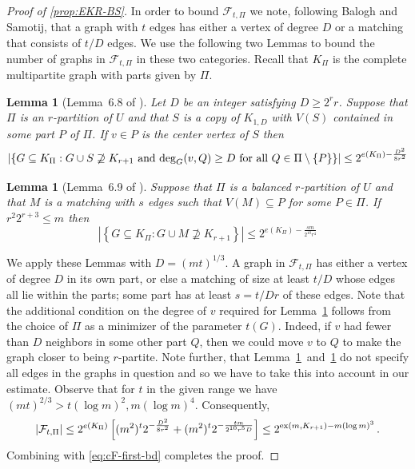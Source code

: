\documentclass[11pt]{article}
\newtheorem{lemma}[theorem]{Lemma}
\theoremstyle{definition}
\theoremstyle{remark}
\newcommand{\cF}{\mathcal{F}}
\begin{document}
\begin{proof}[Proof of \cref{prop:EKR-BS}]
    In order to bound $ \cF_{t, \Pi}$ we note, following Balogh and Samotij, 
    that  a graph with $t$ edges has
    either a vertex of degree $D$ or a matching that consists of $t/D$ edges.  
    We use the following two Lemmas
    to bound the number of graphs in $ \cF_{t, \Pi}$ in these two categories. Recall that $ K_\Pi$ is the complete multipartite graph with parts given by $\Pi$.
    \begin{lemma}[Lemma~6.8 of \cite{balogh2019efficient}] \label{lem:star}
    Let $ D$ be an integer satisfying $D \ge 2^rr$. Suppose that $ \Pi$ is an $r$-partition of $ U$ and that $S$ is a copy of $ K_{1,D}$ with $ V(S)$ contained in some part $P$ of $ \Pi$. If $v \in P$ is the center  vertex of $S$ then
    \[ \left| \left\{ G \subseteq K_\Pi: G \cup S \not\supseteq K_{r+1} \text{ and }
    {\rm deg}_G(v,Q) \ge D \text{ for all } Q \in \Pi \setminus \{P\}
    \right\} \right| \le 2^{ e( K_\Pi) - \frac{D^2}{8r^2}} \]
    \end{lemma}
    \begin{lemma}[Lemma~6.9 of \cite{balogh2019efficient}] \label{lem:matching}
    Suppose that  $\Pi$ is a balanced $r$-partition of $U$ and that $M$ is a matching with $s$ edges such that $ V(M) \subseteq P$ for some $P \in \Pi$. If $ r^2 2^{r+3} \le m$ then
    \[ \left| \left\{ G \subseteq K_\Pi: G \cup M \not\supseteq K_{r+1}  \right\} \right| 
    \le 2^{ e(K_\Pi) - \frac{sm}{2^{10}r^4}}
    \]
    \end{lemma}
    \noindent
    We apply these Lemmas with $ D = (mt)^{1/3} $. A graph in $\cF_{t, \Pi}$ has either a vertex of degree $D$ in its own part, or else a matching of size at least $t/D$ whose edges all lie within the parts; some part has at least $s=t/Dr$ of these edges. Note that the additional condition on
    the degree of $v$ required for Lemma~\ref{lem:star} follows from the choice of $\Pi$ as a minimizer of the parameter $t(G)$. Indeed, if $v$ had fewer than $D$ neighbors in some other part $Q$, then we could move $v$ to $Q$ to make the graph closer to being $r$-partite. Note further, that Lemma~\ref{lem:star}~and~\ref{lem:matching} do not specify all edges in the graphs in question and so we have to take this into account in our estimate. Observe that for $t$ in the given range we have $ (mt)^{2/3}  > t ( \log m)^2, m(\log m)^4$. Consequently, 
    \[ | \cF_{t, \Pi}| \le 2^{ e( K_\Pi)} \left[ (m^2)^t 2^{- \frac{ D^2}{8r^2}} + (m^2)^t 2^{- \frac{ tm}{2^{10} r^5 D}}\right] \le 2^{ {\rm ex}(m, K_{r+1}) - m (\log m)^3}\,.\]
    Combining with \eqref{eq:cF-first-bd} completes the proof.
\end{proof}



\end{document}
